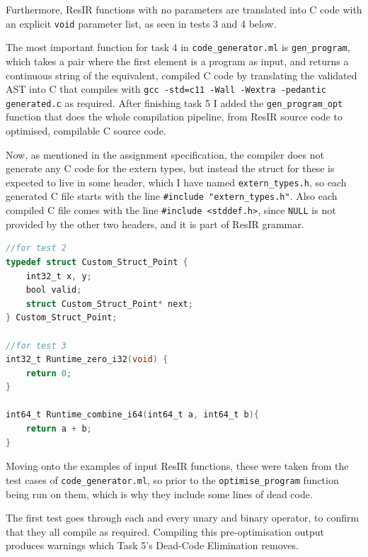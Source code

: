 \documentclass[11pt, a4paper]{article}
\begin{document}
Furthermore, ResIR functions with no parameters are translated into C code with an explicit \texttt{void} parameter list, as seen in tests 3 and 4 below.

\medskip

The most important function for task 4 in \texttt{code\_generator.ml} is \texttt{gen\_program}, which takes a pair where the first element is a program as input, and returns a continuous string
of the equivalent, compiled C code by translating the validated AST into C that compiles with \texttt{gcc -std=c11 -Wall -Wextra -pedantic generated.c} as required. After finishing task 5 I added the 
\texttt{gen\_program\_opt} function that does the whole compilation pipeline, from ResIR source code to optimised, compilable C source code.

\medskip

Now, as mentioned in the assignment specification, the compiler does not generate any C code for the extern types, but instead the struct for these is expected to live in some header,
which I have named \texttt{extern\_types.h}, so each generated C file starts with the line \texttt{\#include "extern\_types.h"}. Also each compiled C file comes with the line 
\texttt{\#include <stddef.h>}, since \texttt{NULL} is not provided by the other two headers, and it is part of ResIR grammar.

\medskip

\begin{lstlisting}[caption=extern\_types.h used for the following tests, language=C, morekeywords={bool, int32_t, int64_t}]
//for test 2
typedef struct Custom_Struct_Point {
    int32_t x, y;
    bool valid;
    struct Custom_Struct_Point* next;
} Custom_Struct_Point;

//for test 3
int32_t Runtime_zero_i32(void) {
    return 0;
}

int64_t Runtime_combine_i64(int64_t a, int64_t b){
    return a + b;
}
\end{lstlisting}

\bigskip

Moving onto the examples of input ResIR functions, these were taken from the test cases of \texttt{code\_generator.ml}, so prior to the \texttt{optimise\_program} function being run on them,
which is why they include some lines of dead code.

\medskip

The first test goes through each and every unary and binary operator, to confirm that they all compile as required. Compiling this 
pre-optimisation output produces warnings which Task 5's Dead-Code Elimination removes.
\end{document}
